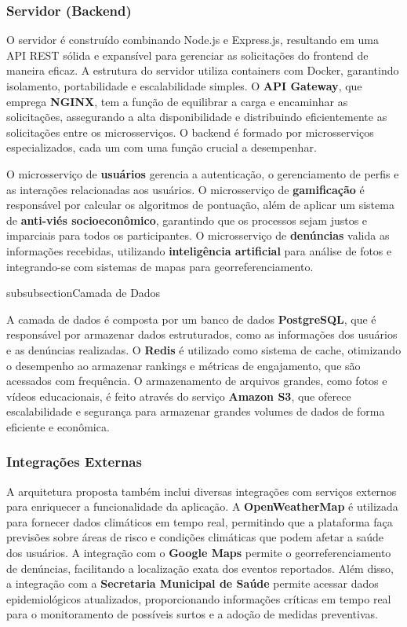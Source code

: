 \documentclass[a4paper, 12pt]{article}
\begin{document}
\subsubsection{Servidor (Backend)}
 O servidor é construído combinando Node.js e Express.js, resultando em uma API REST sólida e expansível para gerenciar as solicitações do frontend de maneira eficaz.  A estrutura do servidor utiliza containers com Docker, garantindo isolamento, portabilidade e escalabilidade simples.  O \textbf{API Gateway}, que emprega \textbf{NGINX}, tem a função de equilibrar a carga e encaminhar as solicitações, assegurando a alta disponibilidade e distribuindo eficientemente as solicitações entre os microsserviços.  O backend é formado por microsserviços especializados, cada um com uma função crucial a desempenhar.
 
 O microsserviço de \textbf{usuários} gerencia a autenticação, o gerenciamento de perfis e as interações relacionadas aos usuários. O microsserviço de \textbf{gamificação} é responsável por calcular os algoritmos de pontuação, além de aplicar um sistema de \textbf{anti-viés socioeconômico}, garantindo que os processos sejam justos e imparciais para todos os participantes. O microsserviço de \textbf{denúncias} valida as informações recebidas, utilizando \textbf{inteligência artificial} para análise de fotos e integrando-se com sistemas de mapas para georreferenciamento.

subsubsection{Camada de Dados}

A camada de dados é composta por um banco de dados \textbf{PostgreSQL}, que é responsável por armazenar dados estruturados, como as informações dos usuários e as denúncias realizadas. O \textbf{Redis} é utilizado como sistema de cache, otimizando o desempenho ao armazenar rankings e métricas de engajamento, que são acessados com frequência. O armazenamento de arquivos grandes, como fotos e vídeos educacionais, é feito através do serviço \textbf{Amazon S3}, que oferece escalabilidade e segurança para armazenar grandes volumes de dados de forma eficiente e econômica.

\subsubsection{Integrações Externas}

A arquitetura proposta também inclui diversas integrações com serviços externos para enriquecer a funcionalidade da aplicação. A \textbf{OpenWeatherMap} é utilizada para fornecer dados climáticos em tempo real, permitindo que a plataforma faça previsões sobre áreas de risco e condições climáticas que podem afetar a saúde dos usuários. A integração com o \textbf{Google Maps} permite o georreferenciamento de denúncias, facilitando a localização exata dos eventos reportados. Além disso, a integração com a \textbf{Secretaria Municipal de Saúde} permite acessar dados epidemiológicos atualizados, proporcionando informações críticas em tempo real para o monitoramento de possíveis surtos e a adoção de medidas preventivas.
\end{document}
